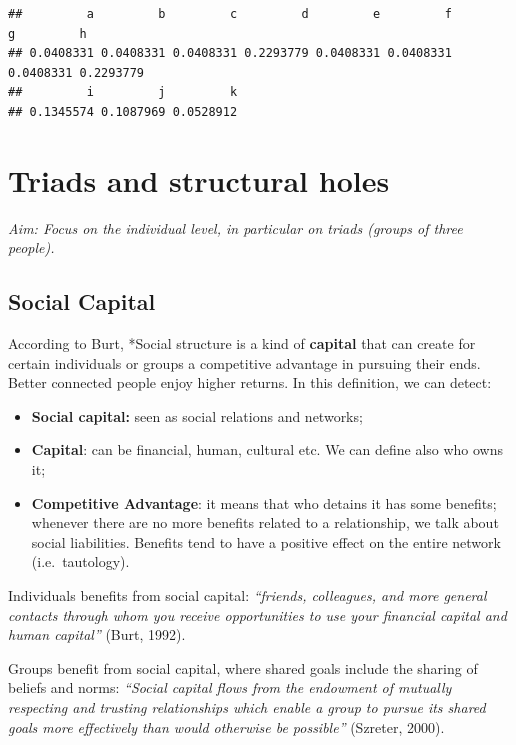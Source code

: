 \documentclass[
  notitlepage,
  onecolumn,
  openany]{book}
\providecommand{\tightlist}{%
  \setlength{\itemsep}{0pt}\setlength{\parskip}{0pt}}
\begin{document}
\begin{verbatim}
##         a         b         c         d         e         f         g         h 
## 0.0408331 0.0408331 0.0408331 0.2293779 0.0408331 0.0408331 0.0408331 0.2293779 
##         i         j         k 
## 0.1345574 0.1087969 0.0528912
\end{verbatim}

\hypertarget{triads-and-structural-holes}{%
\chapter{Triads and structural holes}\label{triads-and-structural-holes}}

\emph{Aim: Focus on the individual level, in particular on triads (groups of
three people).}

\hypertarget{social-capital}{%
\section{Social Capital}\label{social-capital}}

According to Burt, *Social structure is a kind of \textbf{capital} that can
create for certain individuals or groups a competitive advantage in
pursuing their ends. Better connected people enjoy higher returns. In
this definition, we can detect:

\begin{itemize}
\tightlist
\item
  \textbf{Social capital:} seen as social relations and networks;
\item
  \textbf{Capital}: can be financial, human, cultural etc. We can define
  also who owns it;
\item
  \textbf{Competitive Advantage}: it means that who detains it has some
  benefits; whenever there are no more benefits related to a
  relationship, we talk about social liabilities. Benefits tend to
  have a positive effect on the entire network (i.e.~tautology).
\end{itemize}

Individuals benefits from social capital: \emph{``friends, colleagues, and
more general contacts through whom you receive opportunities to use your
financial capital and human capital''} (Burt, 1992).

Groups benefit from social capital, where shared goals include the
sharing of beliefs and norms: \emph{``Social capital flows from the endowment
of mutually respecting and trusting relationships which enable a group
to pursue its shared goals more effectively than would otherwise be
possible''} (Szreter, 2000).
\end{document}

